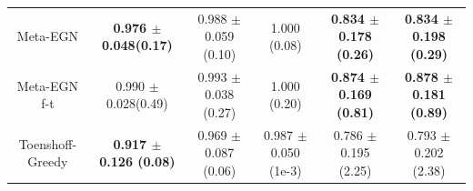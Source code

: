 \begin{table}[t]
\begin{minipage}{1.00 \linewidth}
{\begin{tabular}{@{}cccccc@{}}
Meta-EGN            & \textbf{0.976 \hspace{-0.3mm}$\pm$\hspace{-0.3mm} 0.048(0.17)}  & 0.988 \hspace{-0.3mm}$\pm$\hspace{-0.3mm} 0.059 (0.10) & 1.000 (0.08) &    \textbf{0.834 \hspace{-0.3mm}$\pm$\hspace{-0.3mm} 0.178 (0.26)}     &    \textbf{0.834 \hspace{-0.3mm}$\pm$\hspace{-0.3mm} 0.198 (0.29)}    \\
Meta-EGN f-t        & 0.990 \hspace{-0.3mm}$\pm$\hspace{-0.3mm} 0.028(0.49)  & 0.993 \hspace{-0.3mm}$\pm$\hspace{-0.3mm} 0.038 (0.27) & 1.000 (0.20) &    \textbf{0.874  \hspace{-0.3mm}$\pm$\hspace{-0.3mm} 0.169 (0.81)}    &    \textbf{0.878 \hspace{-0.3mm}$\pm$\hspace{-0.3mm} 0.181 (0.89)}    \\ \midrule
Toenshoff-Greedy & \textbf{0.917 \hspace{-0.3mm}$\pm$\hspace{-0.3mm} 0.126 (0.08)}  & 0.969 \hspace{-0.3mm}$\pm$\hspace{-0.3mm} 0.087 (0.06) & 0.987 \hspace{-0.3mm}$\pm$\hspace{-0.3mm} 0.050 (1e-3) & 0.786 \hspace{-0.3mm}$\pm$\hspace{-0.3mm} 0.195 (2.25) & 0.793 \hspace{-0.3mm}$\pm$\hspace{-0.3mm} 0.202 (2.38) \\ \midrule


\end{tabular}}
\end{minipage}
\end{table}
